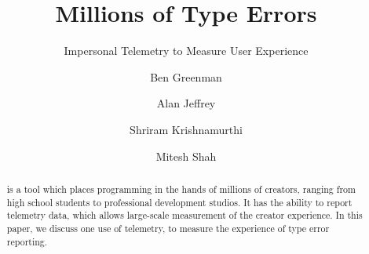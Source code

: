 \documentclass[
  acmsmall,
  review,
  anonymous,
]{acmart}
\begin{document}
\title{Millions of Type Errors}
\subtitle{Impersonal Telemetry to Measure User Experience}


\author{Ben Greenman}

\author{Alan Jeffrey}

\author{Shriram Krishnamurthi}

\author{Mitesh Shah}


\begin{abstract}
   is a tool which places programming in the hands of
  millions of creators, ranging from high school students to professional
  development studios. It has the ability to report telemetry data,
  which allows large-scale measurement of the creator experience. In
  this paper, we discuss one use of telemetry, to measure the experience
  of type error reporting.
\end{abstract}

\newcommand{\code}[1]{\texttt{#1}}
\newcommand{\FILL}{\textbf{FILL}}
\newcommand{\dotscale}[1]{\scalebox{0.72}{#1}}
\newcommand{\wideas}[2]{\makebox[\widthof{#2}][l]{#1}}
\newcommand{\twoline}[2]{\parbox[s]{1.4cm}{\flushleft#1\newline#2}}
\newcommand{\chkYes}{\dotscale{\CIRCLE}}
\newcommand{\chkMaybe}{\wideas{\dotscale{\Circle}}{\chkYes}}
\newcommand{\chkNo}{\wideas{}{\chkYes}}
\newcommand{\pct}[1]{\SI{#1}{\percent}}
\newcommand{\modefont}[1]{\texttt{#1}}
\newcommand{\mnocheck}{\modefont{nocheck}}
\newcommand{\mnonstrict}{\modefont{nonstrict}}
\newcommand{\mstrict}{\modefont{strict}}

\end{document}
